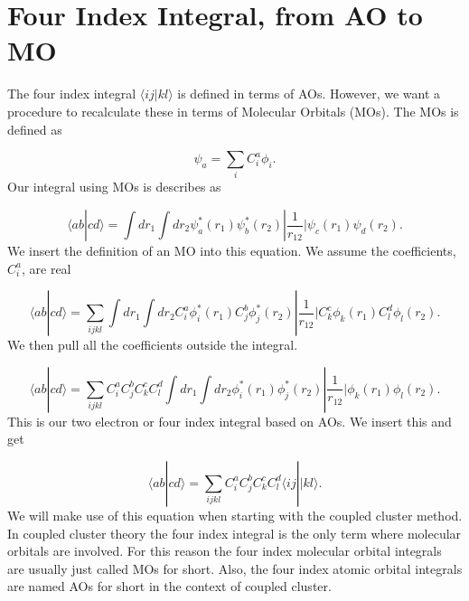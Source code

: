 \documentclass[a4paper,norsk,11pt,twoside]{report}
\begin{document}
\section{Four Index Integral, from AO to MO}
The four index integral $\langle i j | k l \rangle$ is defined in
terms of AOs. However, we want a procedure to recalculate these in
terms of Molecular Orbitals (MOs). The MOs is defined as

\begin{equation}
\psi_a = \sum_i C_i^a \phi_i .
\end{equation}
Our integral using MOs is describes as

\begin{equation}
\langle a b | c d \rangle = 
\int dr_1 \int dr_2 \psi_a^*(r_1) \psi_b^*(r_2) | \frac{1}{r_{12}} | \psi_c(r_1) \psi_d(r_2) .
\end{equation}
We insert the definition of an MO into this equation. We assume the coefficients, $C_i^a$, are real

\begin{equation}
\langle a b | c d \rangle = 
\sum_{ijkl} \int dr_1 \int dr_2 C_i^a \phi_i^*(r_1) C_j^b \phi_j^*(r_2) | \frac{1}{r_{12}} | C_k^c \phi_k(r_1) C_l^d \phi_l(r_2) .
\end{equation}
We then pull all the coefficients outside the integral.

\begin{equation}
\langle a b | c d \rangle = 
\sum_{ijkl} C_i^a C_j^b C_k^c C_l^d \int dr_1 \int dr_2 \phi_i^*(r_1) \phi_j^*(r_2) | \frac{1}{r_{12}} | \phi_k(r_1)  \phi_l(r_2) .
\end{equation}
This is our two electron or four index integral based on AOs. We insert this and get

\begin{equation}
\langle ab | cd \rangle = \sum_{ijkl} C_i^a C_j^b C_k^c C_l^d \langle ij||kl \rangle .
\end{equation} 
We will make use of this equation when starting with the coupled
cluster method. In coupled cluster theory the four index integral is
the only term where molecular orbitals are involved. For this reason
the four index molecular orbital integrals are usually just called MOs
for short. Also, the four index atomic orbital integrals are named AOs
for short in the context of coupled cluster. 
\end{document}
